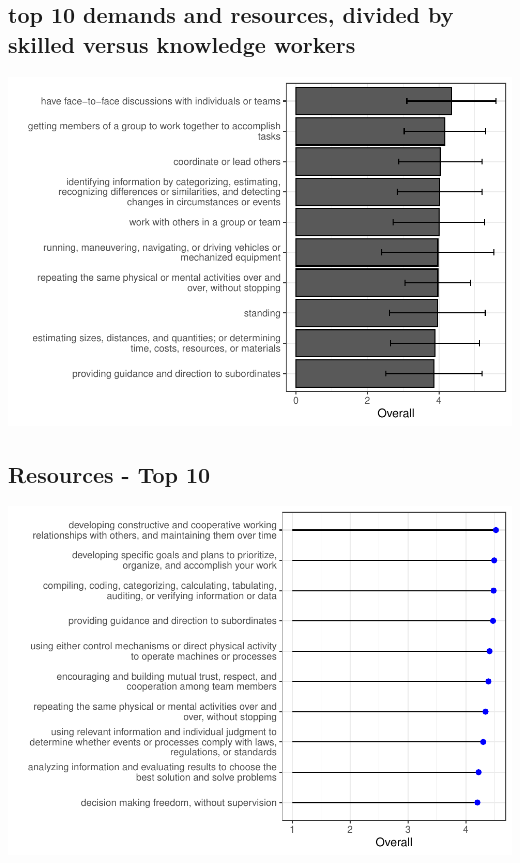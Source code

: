\documentclass[
  english,
  man]{apa6}
\begin{document}
\hypertarget{top-10-demands-and-resources-divided-by-skilled-versus-knowledge-workers}{%
\subsection{top 10 demands and resources, divided by skilled versus knowledge workers}\label{top-10-demands-and-resources-divided-by-skilled-versus-knowledge-workers}}

\includegraphics{SIOPjdr2_files/figure-latex/generalrankings-1.pdf}

\hypertarget{resources---top-10}{%
\subsection{Resources - Top 10}\label{resources---top-10}}

\includegraphics{SIOPjdr2_files/figure-latex/unnamed-chunk-1-1.pdf}
\end{document}
